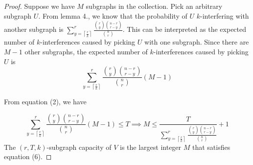 \documentclass[10pt]{extarticle}
\theoremstyle{definition}
\begin{document}
\begin{proof}
    Suppose we have $M$ subgraphs in the collection. Pick an arbitrary subgraph $U$. From lemma 4., we know that the probability of $U$ $k$-interfering with another subgraph is $\sum_{y = \left\lceil \frac{r}{k} \right\rceil}^{r}  \frac{\binom{r}{y} \binom{n-r}{r-y}}{\binom{n}{r}}$. This can be interpreted as the expected number of $k$-interferences caused by picking $U$ with one subgraph. Since there are $M-1$ other subgraphs, the expected number of $k$-interferences caused by picking $U$ is 
    \begin{equation}
        \sum_{y = \left\lceil \frac{r}{k} \right\rceil}^{r}  \frac{\binom{r}{y} \binom{n-r}{r-y}}{\binom{n}{r}} (M-1)
    \end{equation}

    From equation (2), we have 

    \begin{equation}
        \sum_{y = \left\lceil \frac{r}{k} \right\rceil}^{r}  \frac{\binom{r}{y} \binom{n-r}{r-y}}{\binom{n}{r}} (M-1) \le T \implies M \le \frac{T}{\sum_{y = \left\lceil \frac{r}{k} \right\rceil}^{r}  \frac{\binom{r}{y} \binom{n-r}{r-y}}{\binom{n}{r}}} + 1
    \end{equation}
    The $(r,T,k)$-subgraph capacity of $V$ is the largest integer $M$ that satisfies equation (6).
\end{proof}
\end{document}

